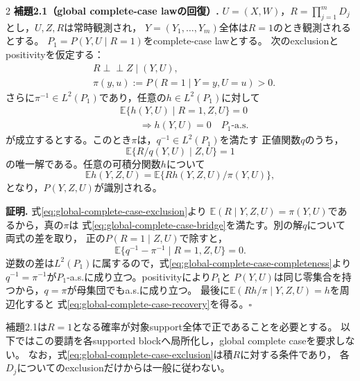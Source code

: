 \documentclass[a4paper,10pt]{article}
\newcommand{\E}{\mathbb E}
\newcommand{\indep}{\mathrel{\perp\!\!\!\perp}}
\begin{document}
\begin{multicols}{2}
\noindent\textbf{補題2.1（global complete-case lawの回復）.}
$U=(X,W)$，$R=\prod_{j=1}^mD_j$とし，$U,Z,R$は常時観測され，
$Y=(Y_1,\ldots,Y_m)$全体は$R=1$のとき観測されるとする。
$P_1=P(Y,U\mid R=1)$をcomplete-case lawとする。
次のexclusionとpositivityを仮定する：
\begin{equation}
\begin{aligned}
&R\indep Z\mid(Y,U),\\
&\pi(y,u):=P(R=1\mid Y=y,U=u)>0.
\end{aligned}
\label{eq:global-complete-case-exclusion}
\end{equation}
さらに$\pi^{-1}\in L^2(P_1)$であり，任意の$h\in L^2(P_1)$に対して
\begin{equation}
\begin{aligned}
&\E\{h(Y,U)\mid R=1,Z,U\}=0\\
&\qquad\Longrightarrow h(Y,U)=0\quad P_1\text{-a.s.}
\end{aligned}
\label{eq:global-complete-case-completeness}
\end{equation}
が成立するとする。このとき$\pi$は，$q^{-1}\in L^2(P_1)$を満たす
正値関数$q$のうち，
\begin{equation}
\E\{R/q(Y,U)\mid Z,U\}=1
\label{eq:global-complete-case-bridge}
\end{equation}
の唯一解である。任意の可積分関数$h$について
\begin{equation}
\E h(Y,Z,U)=\E\{Rh(Y,Z,U)/\pi(Y,U)\},
\label{eq:global-complete-case-recovery}
\end{equation}
となり，$P(Y,Z,U)$が識別される。

\noindent\textbf{証明.}
式\eqref{eq:global-complete-case-exclusion}より
$\E(R\mid Y,Z,U)=\pi(Y,U)$であるから，真の$\pi$は
式\eqref{eq:global-complete-case-bridge}を満たす。別の解$q$について両式の差を取り，
正の$P(R=1\mid Z,U)$で除すと，
\begin{equation}
\E\{q^{-1}-\pi^{-1}\mid R=1,Z,U\}=0.
\label{eq:global-complete-case-uniqueness}
\end{equation}
逆数の差は$L^2(P_1)$に属するので，式\eqref{eq:global-complete-case-completeness}より
$q^{-1}=\pi^{-1}$が$P_1$-a.s.に成り立つ。positivityにより$P_1$と
$P(Y,U)$は同じ零集合を持つから，$q=\pi$が母集団でもa.s.に成り立つ。
最後に$\E(Rh/\pi\mid Y,Z,U)=h$を周辺化すると
式\eqref{eq:global-complete-case-recovery}を得る。\hfill$\square$

補題2.1は$R=1$となる確率が対象support全体で正であることを必要とする。
以下ではこの要請を各supported blockへ局所化し，global complete caseを要求しない。
なお，式\eqref{eq:global-complete-case-exclusion}は積$R$に対する条件であり，
各$D_j$についてのexclusionだけからは一般に従わない。


\end{multicols}
\end{document}
